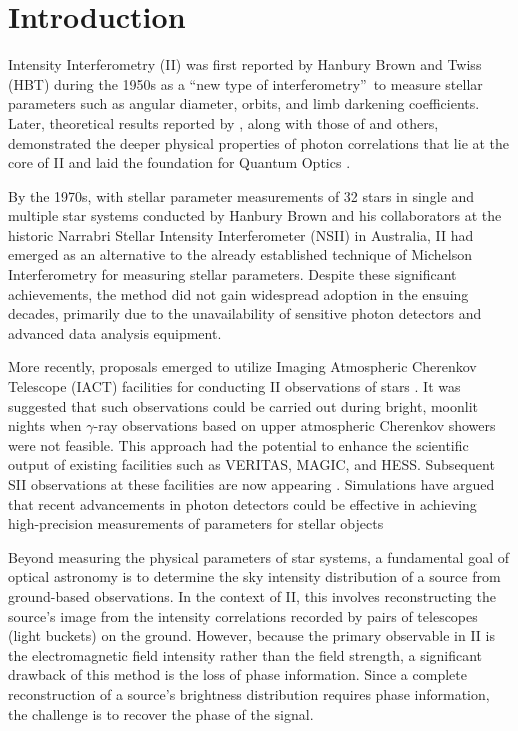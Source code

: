 \section{Introduction}

Intensity Interferometry (II) was first reported by Hanbury Brown and Twiss (HBT) during the 1950s \citep{brown1954lxxiv, HBT56} as a \textquotedblleft new type of interferometry\textquotedblright\ to measure stellar parameters such as angular diameter, orbits, and limb darkening coefficients. Later, theoretical results reported by \cite{brown1957interferometry, brown1958interferometry}, along with those of \cite{glauber1963quantum} and others, demonstrated the deeper physical properties of photon correlations that lie at the core of II and laid the foundation for Quantum Optics \cite[for textbook treatments see][]{MandelWolf1995, Hecht2002}.

By the 1970s, with stellar parameter measurements of 32 stars in single and multiple star systems conducted by Hanbury Brown and his collaborators \citep{hanbury1974angular} at the historic Narrabri Stellar Intensity Interferometer (NSII) in Australia, II had emerged as an alternative to the already established technique of Michelson Interferometry for measuring stellar parameters. Despite these significant achievements, the method did not gain widespread adoption in the ensuing decades, primarily due to the unavailability of sensitive photon detectors and advanced data analysis equipment.

More recently, proposals emerged to utilize Imaging Atmospheric Cherenkov Telescope (IACT) facilities for conducting II observations of stars \citep{LeBohec2006, nunez2010stellar, nunez2012high, Dravins2013}. It was suggested that such observations could be carried out during bright, moonlit nights when $\gamma$-ray observations based on upper atmospheric Cherenkov showers were not feasible. This approach had the potential to enhance the scientific output of existing facilities such as VERITAS, MAGIC, and HESS. Subsequent SII observations at these facilities are now appearing \citep{abeysekara2020demonstration, Abe2024MAGIC, Zmija2023}.  Simulations \citep[e.g.,][]{10.1093/mnras/stab2391, 10.1093/mnras/stac2433} have argued that recent advancements in photon detectors could be effective in achieving high-precision measurements of parameters for stellar objects 

Beyond measuring the physical parameters of star systems, a fundamental goal of optical astronomy is to determine the sky intensity distribution of a source from ground-based observations. In the context of II, this involves reconstructing the source's image from the intensity correlations recorded by pairs of telescopes (light buckets) on the ground. However, because the primary observable in II is the electromagnetic field intensity rather than the field strength, a significant drawback of this method is the loss of phase information. Since a complete reconstruction of a source's brightness distribution requires phase information, the challenge is to recover the phase of the signal.

